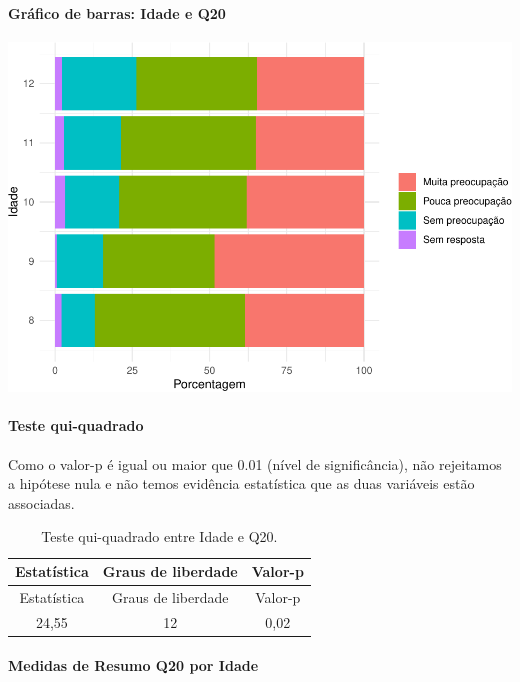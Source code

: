 \documentclass[]{article}
\let\oldparagraph\paragraph
\renewcommand{\paragraph}[1]{\oldparagraph{#1}\mbox{}}
\begin{document}
\hypertarget{gruxe1fico-de-barras-idade-e-q20}{%
\paragraph{Gráfico de barras: Idade e Q20}\label{gruxe1fico-de-barras-idade-e-q20}}

\begin{center}\includegraphics[width=0.75\linewidth]{relatorio_covid19_files/figure-latex/unnamed-chunk-387-1} \end{center}

\hypertarget{teste-qui-quadrado-34}{%
\paragraph{Teste qui-quadrado}\label{teste-qui-quadrado-34}}

Como o valor-p é igual ou maior que 0.01 (nível de significância), não rejeitamos a hipótese nula e não temos evidência estatística que as duas variáveis estão associadas.

\begin{longtable}[]{@{}ccc@{}}
\caption{\label{tab:unnamed-chunk-389}Teste qui-quadrado entre Idade e Q20.}\tabularnewline
\toprule
Estatística & Graus de liberdade & Valor-p\tabularnewline
\midrule
\endfirsthead
\toprule
Estatística & Graus de liberdade & Valor-p\tabularnewline
\midrule
\endhead
24,55 & 12 & 0,02\tabularnewline
\bottomrule
\end{longtable}

\cleardoublepage

\hypertarget{medidas-de-resumo-q20-por-idade}{%
\paragraph{Medidas de Resumo Q20 por Idade}\label{medidas-de-resumo-q20-por-idade}}
\end{document}
